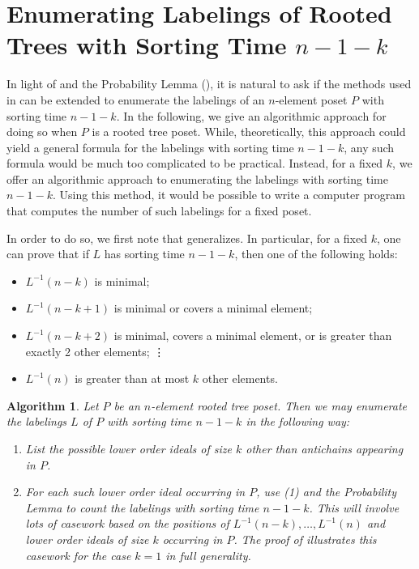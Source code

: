 \documentclass[11pt]{amsart}
\newtheorem{Algorithm}[thm]{Algorithm}
\theoremstyle{definition}
\newcommand{\inverse}{^{-1}}
\begin{document}
\section{Enumerating Labelings of Rooted Trees with Sorting Time $ n-1-k $}\label{sorting time n-k-1}
In light of  and the Probability Lemma (), it is natural to ask if the methods used in  can be extended to enumerate the labelings of an $ n $-element poset $ P $ with sorting time $ n-1-k $. In the following, we give an algorithmic approach for doing so when $ P $ is a rooted tree poset. While, theoretically, this approach could yield a general formula for the labelings with sorting time $ n-1-k $, any such formula would be much too complicated to be practical. Instead, for a fixed $ k $, we offer an algorithmic approach to enumerating the labelings with sorting time $ n-1-k $. Using this method, it would be possible to write a computer program that computes the number of such labelings for a fixed poset.

In order to do so, we first note that  generalizes. In particular, for a fixed $ k $, one can prove that if $ L $ has sorting time $ n-1-k $, then one of the following holds:
\begin{itemize}
	\item $ L\inverse(n-k) $ is minimal;
	\item $ L\inverse(n-k+1) $ is minimal or covers a minimal element;
	\item $ L\inverse(n-k+2) $ is minimal, covers a minimal element, or is greater than exactly 2 other elements;
	\subitem\vdots
	\item $ L\inverse(n) $ is greater than at most $ k $ other elements. 
\end{itemize}

\begin{Algorithm}
	Let $ P $ be an $ n $-element rooted tree poset. Then we may enumerate the labelings $ L $ of $ P $ with sorting time $ n-1-k $ in the following way:
	\begin{enumerate}
		\item List the possible lower order ideals of size $ k $ other than antichains appearing in $ P $.
		\item For each such lower order ideal occurring in $ P $, use (1) and the Probability Lemma to count the labelings with sorting time $ n-1-k $. This will involve lots of casework based on the positions of $ L\inverse(n-k),\ldots,L\inverse(n) $ and lower order ideals of size $ k $ occurring in $ P $. The proof of  illustrates this casework for the case $ k=1 $ in full generality.  
	\end{enumerate}
\end{Algorithm}
\end{document}
